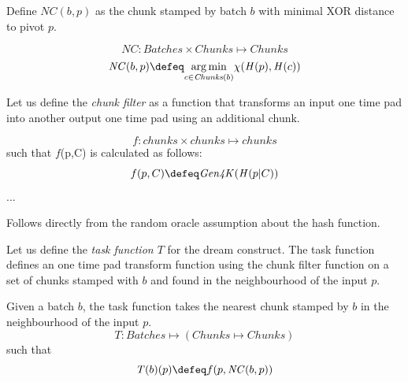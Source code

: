 \begin{definition}
\label{def:cin}
Define  $\mathit{NC}(b,p)$ as the chunk stamped by batch $b$ with minimal XOR distance to pivot $p$.

\begin{equation}
\mathit{NC}: \mathit{Batches}\times \mathit{Chunks} \mapsto \mathit{Chunks}
\end{equation}
\begin{equation}
\mathit{NC}(b,p)\defeq \underset{c\in \mathit{Chunks}(b)}{\operatorname{arg\,min}}\chi(\mathit{H}(p),\mathit{H}(c))
\end{equation}
\end{definition}

Let us define the \emph{chunk filter} as a function that transforms an input one time pad into another output one time pad using an additional chunk.

\begin{definition}
\label{def:chunk-filter}
\begin{equation}
f: \mathit{chunks}\times\mathit{chunks}\mapsto \mathit{chunks}
\end{equation}
such that $f$(p,C) is calculated as follows:  
\begin{equation}
    f(p,C) \defeq \mathit{Gen4K}(\mathit{H}(p|C)) 
\end{equation}
...
\end{definition}

\begin{corollary}
\label{cor:chunk-filter-oracle}
Follows directly from the random oracle assumption about the hash function.
\end{corollary}

Let us define the \emph{task function $T$} for the dream construct. The task function defines an one time pad transform function using the chunk filter function on a set of chunks stamped with $b$ and found in the neighbourhood of the input $p$.

\begin{definition}
\label{def:task}
Given a batch $b$, the task function takes the nearest chunk stamped by $b$ in the  neighbourhood of the input $p$.
\begin{equation}
T: \mathit{Batches} \mapsto (\mathit{Chunks} \mapsto \mathit{Chunks})
\end{equation}
such that
\begin{equation}
\mathit{T}(b)(p)\defeq f(p,\mathit{NC}(b,p)) 
\end{equation}

\end{definition}


